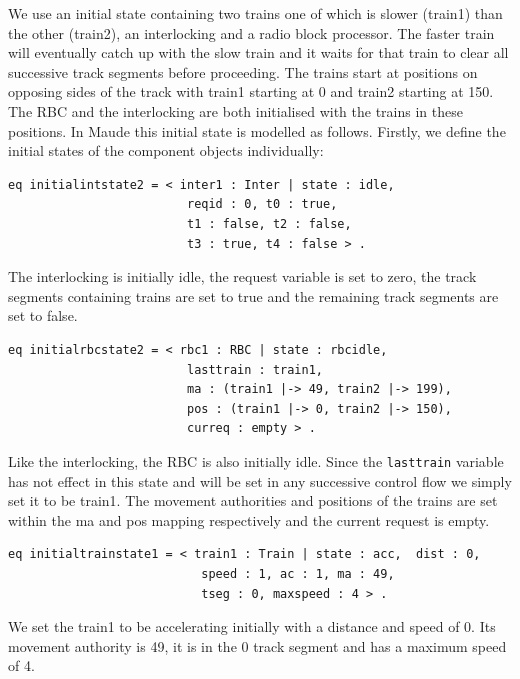 We use an initial state containing two trains one of which is slower (train1) than the other (train2), an interlocking and a radio block processor. The faster train will eventually catch up with the slow train and it waits for that train to clear all successive track segments before proceeding. The trains start at positions on opposing sides of the track with train1 starting at 0 and train2 starting at 150. The RBC and the interlocking are both initialised with the trains in these positions. In Maude this initial state is modelled as follows. Firstly, we define the initial states of the component objects individually:

\begin{lstlisting}[caption = The initial interlocking state in Maude]
 eq initialintstate2 = < inter1 : Inter | state : idle, 
                         reqid : 0, t0 : true, 
                         t1 : false, t2 : false, 
                         t3 : true, t4 : false > .
\end{lstlisting}

The  interlocking is initially idle, the request variable is set to zero, the track segments containing trains are set to true and the remaining track segments are set to false.

\begin{lstlisting}[caption = The initial RBC state in Maude]
 eq initialrbcstate2 = < rbc1 : RBC | state : rbcidle, 
                         lasttrain : train1,  
                         ma : (train1 |-> 49, train2 |-> 199), 
                         pos : (train1 |-> 0, train2 |-> 150), 
                         curreq : empty > .
\end{lstlisting}

Like the interlocking, the RBC is also initially idle. Since the \texttt{lasttrain} variable has not effect in this state and will be set in any successive control flow we simply set it to be train1. The movement authorities  and positions of the trains are set within the ma and pos mapping respectively and the current request is empty.  

\begin{lstlisting}[caption = The intital state of train1 in Maude]
 eq initialtrainstate1 = < train1 : Train | state : acc,  dist : 0, 
                           speed : 1, ac : 1, ma : 49, 
                           tseg : 0, maxspeed : 4 > .
\end{lstlisting}
We set the train1 to be accelerating initially with a distance and speed of 0. Its movement authority is 49, it is in the 0 track segment and has a maximum speed of 4. 

